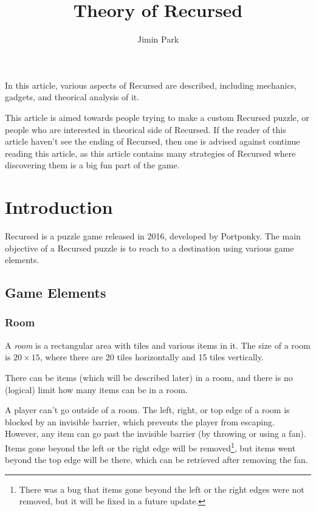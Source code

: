 \documentclass[a4paper]{article}
\theoremstyle{definition}
\begin{document}
\title{Theory of Recursed}
\author{Jimin Park}
\maketitle

In this article, various aspects of Recursed are described, including mechanics, gadgets, and theorical analysis of it.

This article is aimed towards people trying to make a custom Recursed puzzle, or people who are interested in theorical side of Recursed.
If the reader of this article haven't see the ending of Recursed, then one is advised against continue reading this article,
as this article contains many strategies of Recursed where discovering them is a big fun part of the game.

\tableofcontents

\section{Introduction}
Recursed is a puzzle game released in 2016, developed by Portponky.
The main objective of a Recursed puzzle is to reach to a destination using various game elements.

\subsection{Game Elements}

\subsubsection{Room}
A \emph{room} is a rectangular area with tiles and various items in it.
The size of a room is $20\times15$, where there are 20 tiles horizontally and 15 tiles vertically.

There can be items (which will be described later) in a room, and there is no (logical) limit how many items can be in a room.

A player can't go outside of a room. The left, right, or top edge of a room is blocked by an invisible barrier,
which prevents the player from escaping. However, any item can go past the invisible barrier (by throwing or using a fan).
Items gone beyond the left or the right edge will be removed\footnote{There was a bug that items gone beyond the left or the right
edges were not removed, but it will be fixed in a future update.},
but items went beyond the top edge will be there, which can be retrieved after removing the fan.
\end{document}

